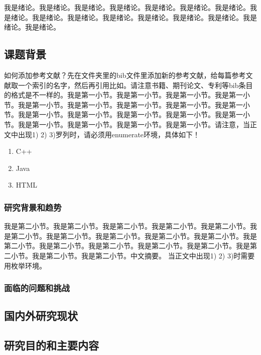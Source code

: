 \documentclass[supercite]{HustGraduPaper}
\theoremstyle{definition}
\begin{document}
我是绪论。我是绪论。我是绪论。我是绪论。我是绪论。我是绪论。我是绪论。我是绪论。我是绪论。我是绪论。我是绪论。我是绪论。我是绪论。我是绪论。我是绪论。我是绪论。

\subsection{课题背景}

如何添加参考文献？先在文件夹里的bib文件里添加新的参考文献，给每篇参考文献取一个索引的名字，然后再引用比如\cite{STR2021Neurocom}\cite{AVS2021Neurocom, Rezaei2014CVPR}。请注意书籍、期刊论文、专利等bib条目的格式是不一样的。我是第一小节。我是第一小节。我是第一小节。我是第一小节。我是第一小节。我是第一小节。我是第一小节。我是第一小节。我是第一小节。我是第一小节。我是第一小节。我是第一小节。我是第一小节。我是第一小节。我是第一小节。我是第一小节。我是第一小节。我是第一小节。请注意，当正文中出现1) 2) 3)罗列时，请必须用enumerate环境，具体如下！

\begin{enumerate}
	\renewcommand{\labelenumi}{\theenumi)}
	\item C++
	\item Java
	\item HTML
\end{enumerate}

\subsubsection{研究背景和趋势}

我是第二小节。我是第二小节。我是第二小节。我是第二小节。我是第二小节。我是第二小节。我是第二小节。我是第二小节。我是第二小节。我是第二小节。我是第二小节。我是第二小节。我是第二小节。我是第二小节。我是第二小节。我是第二小节。我是第二小节。我是第二小节。中文摘要。
当正文中出现1) 2) 3)时需要用枚举环境。

\subsubsection{面临的问题和挑战}

\subsection{国内外研究现状}

\subsection{研究目的和主要内容}
\end{document}
